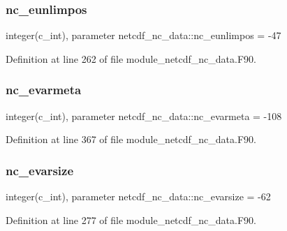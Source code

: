 \mbox{\label{namespacenetcdf__nc__data_a62be59604a485bc9d1259a8a94a9e501}} 
\subsubsection{\texorpdfstring{nc\+\_\+eunlimpos}{nc\_eunlimpos}}
{\footnotesize\ttfamily integer(c\+\_\+int), parameter netcdf\+\_\+nc\+\_\+data\+::nc\+\_\+eunlimpos = -\/47}



Definition at line 262 of file module\+\_\+netcdf\+\_\+nc\+\_\+data.\+F90.

\mbox{\label{namespacenetcdf__nc__data_aa1c9018bd64fdff140ce7bbf2b2408ff}} 
\subsubsection{\texorpdfstring{nc\+\_\+evarmeta}{nc\_evarmeta}}
{\footnotesize\ttfamily integer(c\+\_\+int), parameter netcdf\+\_\+nc\+\_\+data\+::nc\+\_\+evarmeta = -\/108}



Definition at line 367 of file module\+\_\+netcdf\+\_\+nc\+\_\+data.\+F90.

\mbox{\label{namespacenetcdf__nc__data_a59fa828790c0a023fd1599da7ec76a8b}} 
\subsubsection{\texorpdfstring{nc\+\_\+evarsize}{nc\_evarsize}}
{\footnotesize\ttfamily integer(c\+\_\+int), parameter netcdf\+\_\+nc\+\_\+data\+::nc\+\_\+evarsize = -\/62}



Definition at line 277 of file module\+\_\+netcdf\+\_\+nc\+\_\+data.\+F90.

